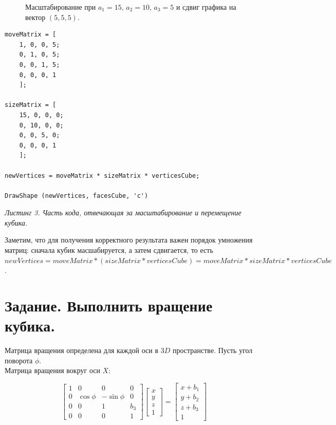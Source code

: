 \documentclass[a5paper, 10pt]{article}
\theoremstyle{definition}
\theoremstyle{plain}
\theoremstyle{remark}
\begin{document}
\begin{figure}[h!]
\caption{Масштабирование при $a_1 = 15, \, a_2 = 10, \, a_3 = 5$ и сдвиг графика на вектор $(5, 5, 5)$.}
\end{figure}
\newpage
\begin{center}
\begin{lstlisting}
moveMatrix = [
    1, 0, 0, 5;
    0, 1, 0, 5;
    0, 0, 1, 5;
    0, 0, 0, 1
    ];

sizeMatrix = [
    15, 0, 0, 0;
    0, 10, 0, 0;
    0, 0, 5, 0;
    0, 0, 0, 1
    ];

newVertices = moveMatrix * sizeMatrix * verticesCube;

DrawShape (newVertices, facesCube, 'c')
\end{lstlisting}
\textit{Листинг 3. Часть кода, отвечающая за масштабирование и перемещение кубика.}
\end{center}
Заметим, что для получения корректного результата важен порядок умножения матриц: сначала кубик масшабируется, а затем сдвигается, то есть $newVertices = moveMatrix * (sizeMatrix * verticesCube) = moveMatrix *sizeMatrix * verticesCube$.

\newpage
\section{Задание. Выполнить вращение кубика.}
Матрица вращения определена для каждой оси в $3D$ пространстве. Пусть угол поворота $\phi$.\\
Матрица вращения вокруг оси $X$:

\begin{equation}
\begin{bmatrix}
1 & 0 & 0 & 0\\
0 & \cos \phi & - \sin \phi & 0 \\
0 & 0 & 1 & b_3\\
0 & 0 & 0 & 1
\end{bmatrix}
\begin{bmatrix}
x\\
y\\
z\\
1
\end{bmatrix}
=
\begin{bmatrix}
x + b_1\\
y + b_2\\
z + b_3\\
1
\end{bmatrix}
\end{equation}
\end{document}
